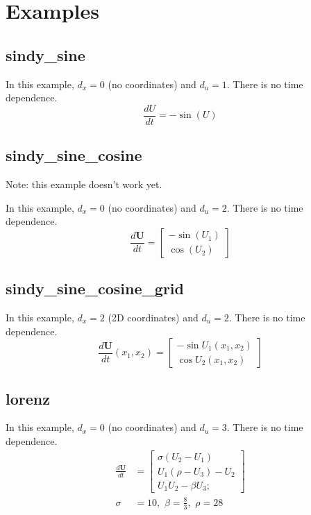 \documentclass{article}
\let\vec\mathbf
\begin{document}
\section{Examples}

\subsection{sindy\_sine}
In this example, $d_x = 0$ (no coordinates) and $d_u = 1$. There is no time dependence.
\begin{equation*}
\frac{dU}{dt} = -\sin(U)
\end{equation*}


\subsection{sindy\_sine\_cosine}
Note: this example doesn't work yet.

In this example, $d_x = 0$ (no coordinates) and $d_u = 2$. There is no time dependence.
\begin{equation*}
\frac{d\vec{U}}{dt} =
\begin{bmatrix}
-\sin(U_1) \\ \cos(U_2)
\end{bmatrix}
\end{equation*}


\subsection{sindy\_sine\_cosine\_grid}
In this example, $d_x = 2$ (2D coordinates) and $d_u = 2$. There is no time dependence.
\begin{equation*}
\frac{d\vec{U}}{dt}(x_1, x_2) =
\begin{bmatrix}
-\sin U_1(x_1,x_2) \\ \cos U_2(x_1,x_2)
\end{bmatrix}
\end{equation*}


\subsection{lorenz}
In this example, $d_x = 0$ (no coordinates) and $d_u = 3$. There is no time dependence.
\begin{align*}
\frac{d\vec{U}}{dt} &=
\begin{bmatrix}
\sigma(U_2-U_1) \\
U_1(\rho-U_3)-U_2 \\
U_1U_2-\beta U_3;
\end{bmatrix} \\
\sigma &= 10,\,\, \beta = \frac{8}{3},\,\, \rho = 28
\end{align*}
\end{document}
